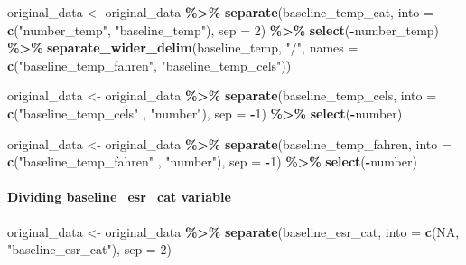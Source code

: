 \documentclass[
]{article}
\newenvironment{Shaded}{\begin{snugshade}}{\end{snugshade}}
\newcommand{\AttributeTok}[1]{\textcolor[rgb]{0.13,0.29,0.53}{#1}}
\newcommand{\ConstantTok}[1]{\textcolor[rgb]{0.56,0.35,0.01}{#1}}
\newcommand{\DecValTok}[1]{\textcolor[rgb]{0.00,0.00,0.81}{#1}}
\newcommand{\FunctionTok}[1]{\textcolor[rgb]{0.13,0.29,0.53}{\textbf{#1}}}
\newcommand{\NormalTok}[1]{#1}
\newcommand{\OtherTok}[1]{\textcolor[rgb]{0.56,0.35,0.01}{#1}}
\newcommand{\SpecialCharTok}[1]{\textcolor[rgb]{0.81,0.36,0.00}{\textbf{#1}}}
\newcommand{\StringTok}[1]{\textcolor[rgb]{0.31,0.60,0.02}{#1}}
\begin{document}
\begin{Shaded}
\begin{Highlighting}[]
\NormalTok{original\_data }\OtherTok{\textless{}{-}}\NormalTok{ original\_data }\SpecialCharTok{\%\textgreater{}\%} 
  \FunctionTok{separate}\NormalTok{(baseline\_temp\_cat, }\AttributeTok{into =} \FunctionTok{c}\NormalTok{(}\StringTok{"number\_temp"}\NormalTok{, }\StringTok{"baseline\_temp"}\NormalTok{), }
           \AttributeTok{sep =} \DecValTok{2}\NormalTok{) }\SpecialCharTok{\%\textgreater{}\%} \FunctionTok{select}\NormalTok{(}\SpecialCharTok{{-}}\NormalTok{number\_temp) }\SpecialCharTok{\%\textgreater{}\%} 
  \FunctionTok{separate\_wider\_delim}\NormalTok{(baseline\_temp, }\StringTok{"/"}\NormalTok{, }\AttributeTok{names =} \FunctionTok{c}\NormalTok{(}\StringTok{"baseline\_temp\_fahren"}\NormalTok{, }\StringTok{"baseline\_temp\_cels"}\NormalTok{))}

\NormalTok{original\_data }\OtherTok{\textless{}{-}}\NormalTok{ original\_data }\SpecialCharTok{\%\textgreater{}\%} 
  \FunctionTok{separate}\NormalTok{(baseline\_temp\_cels, }\AttributeTok{into =} \FunctionTok{c}\NormalTok{(}\StringTok{"baseline\_temp\_cels"}\NormalTok{ , }\StringTok{"number"}\NormalTok{),}
           \AttributeTok{sep =} \SpecialCharTok{{-}}\DecValTok{1}\NormalTok{) }\SpecialCharTok{\%\textgreater{}\%} \FunctionTok{select}\NormalTok{(}\SpecialCharTok{{-}}\NormalTok{number)}

\NormalTok{original\_data }\OtherTok{\textless{}{-}}\NormalTok{ original\_data }\SpecialCharTok{\%\textgreater{}\%} 
  \FunctionTok{separate}\NormalTok{(baseline\_temp\_fahren, }\AttributeTok{into =} \FunctionTok{c}\NormalTok{(}\StringTok{"baseline\_temp\_fahren"}\NormalTok{ , }\StringTok{"number"}\NormalTok{),}
           \AttributeTok{sep =} \SpecialCharTok{{-}}\DecValTok{1}\NormalTok{) }\SpecialCharTok{\%\textgreater{}\%} \FunctionTok{select}\NormalTok{(}\SpecialCharTok{{-}}\NormalTok{number)}
\end{Highlighting}
\end{Shaded}

\paragraph{Dividing baseline\_esr\_cat
variable}\label{dividing-baseline_esr_cat-variable}

\begin{Shaded}
\begin{Highlighting}[]
\NormalTok{original\_data }\OtherTok{\textless{}{-}}\NormalTok{ original\_data }\SpecialCharTok{\%\textgreater{}\%} 
  \FunctionTok{separate}\NormalTok{(baseline\_esr\_cat, }\AttributeTok{into =} \FunctionTok{c}\NormalTok{(}\ConstantTok{NA}\NormalTok{, }\StringTok{"baseline\_esr\_cat"}\NormalTok{), }\AttributeTok{sep =} \DecValTok{2}\NormalTok{)}
\end{Highlighting}
\end{Shaded}
\end{document}

